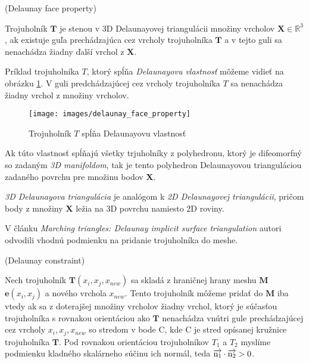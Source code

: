 \begin{definition}
    (Delaunay face property)

    Trojuholník $\mathbf{T}$ je stenou v 3D Delaunayovej triangulácii množiny vrcholov 
    $\mathbf{X}\in \mathbb{R}^3$, ak existuje guľa prechádzajúca cez vrcholy trojuholníka 
    $\mathbf{T}$ a v tejto guli sa nenachádza žiadny ďalší vrchol z $\mathbf{X}$. 
\end{definition}

Príklad trojuholníka $T$, ktorý spĺňa \textit{Delaunayovu vlastnosť} môžeme vidieť na obrázku 
\ref{obr:delaunay_face_property}. V guli predchádzajúcej cez vrcholy trojuholníka $T$ 
sa nenachádza žiadny vrchol z množiny vrcholov.

\begin{figure}
    \centerline{\texttt{[image: images/delaunay\_face\_property]}}
    \caption[\cite{hilton1996marching} Trojuholník $T$ spĺňa Delaunayovu vlastnosť]{\cite{hilton1996marching} Trojuholník $T$ spĺňa Delaunayovu vlastnosť}
    \label{obr:delaunay_face_property}
\end{figure}

Ak túto vlastnosť spĺňajú všetky trjuholníky z polyhedronu, ktorý je difeomorfný so zadaným 
\textit{3D manifoldom}, tak je tento polyhedron Delaunayovou trianguláciou zadaného povrchu pre 
množinu bodov $\mathbf{X}$.

\textit{3D Delaunayova triangulácia} je analógom k \textit{2D Delaunayovej triangulácii}, pričom
body z množiny $\mathbf{X}$ ležia na 3D povrchu namiesto 2D roviny.

V článku \textit{Marching triangles: Delaunay implicit surface triangulation} \cite{hilton1997marching}
autori odvodili vhodnú podmienku na pridanie trojuholníka do meshe.

\begin{definition}
    (Delaunay constraint)

    Nech trojuholník $\mathbf{T}(x_i, x_j, x_{new})$ sa skladá z hraničnej hrany meshu $\mathbf{M}$ 
    $\mathbf{e}(x_i, x_j)$ a nového vrchola $x_{new}$. Tento trojuholník môžeme pridať do 
    $\mathbf{M}$ iba vtedy ak sa z doterajšej 
    množiny vrcholov žiadny vrchol, ktorý je súčasťou trojuholníka s rovnakou orientáciou ako 
    $\mathbf{T}$ nenachádza vnútri gule prechádzajúcej cez vrcholy $x_i, x_j, x_{new}$ so stredom 
    v bode C, kde C je stred opísanej kružnice trojuholníka $\mathbf{T}$. Pod rovnakou orientáciou 
    trojuholníkov $T_1$ a $T_2$ myslíme podmienku kladného skalárneho súčinu ich normál, teda 
    $\overrightarrow{\rm n_1} \cdot \overrightarrow{\rm n_2} > 0$.
\end{definition}




